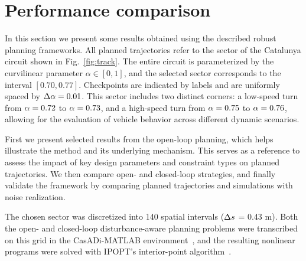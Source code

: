 \section{Performance comparison}
\label{sec:performance_comparison}

In this section we present some results obtained using the described robust planning frameworks. All planned trajectories refer to the sector of the Catalunya circuit shown in Fig.~\ref{fig:track}.
The entire circuit is parameterized by the curvilinear parameter $\alpha \in [0,1]$, and the selected sector corresponds to the interval $\left[0.70, 0.77\right]$. Checkpoints are indicated by labels and are uniformly spaced by $\Delta\alpha=0.01$. This sector includes two distinct corners: a low-speed turn from $\alpha = 0.72$ to $\alpha = 0.73$, and a high-speed turn from $\alpha = 0.75$ to $\alpha = 0.76$, allowing for the evaluation of vehicle behavior across different dynamic scenarios.

First we present selected results from the open-loop planning, which helps illustrate the method and its underlying mechanism. 
This serves as a reference to assess the impact of key design parameters and constraint types on planned trajectories.
We then compare open- and closed-loop strategies, and finally validate the framework by comparing planned trajectories and simulations with noise realization.

The chosen sector was discretized into 140 spatial intervals ($\Delta s$ = 0.43 m). Both the open- and closed-loop disturbance-aware planning problems were transcribed on this grid in the CasADi-MATLAB environment~\cite{Andersson:MPC:2019}, and the resulting nonlinear programs were solved with IPOPT's interior-point algorithm~\cite{Wachter:MP:2006}.
  


